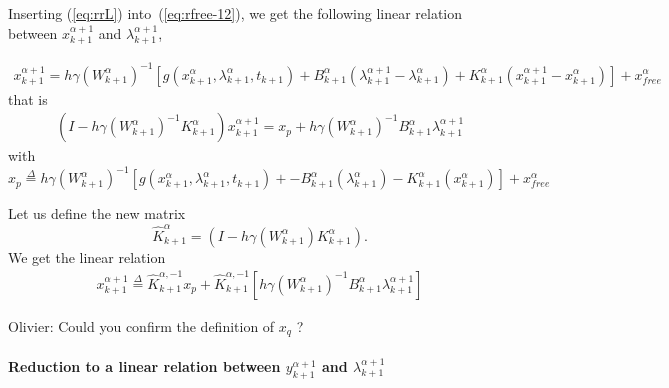 Inserting (\ref{eq:rrL}) into~(\ref{eq:rfree-12}), we get the following linear relation between $x^{\alpha+1}_{k+1}$ and
$\lambda^{\alpha+1}_{k+1}$, 

\begin{equation}
   \begin{array}{l}
     x^{\alpha+1}_{k+1} = h\gamma(W^{\alpha}_{k+1} )^{-1}\left[g(x^{\alpha}_{k+1},\lambda^{\alpha}_{k+1},t_{k+1}) +
    B^{\alpha}_{k+1} (\lambda^{\alpha+1}_{k+1} - \lambda^{\alpha}_{k+1})+K^{\alpha}_{k+1}
    (x^{\alpha+1}_{k+1} - x^{\alpha}_{k+1}) \right ] +x^\alpha_{free}
\end{array}
\end{equation}
that is 
\begin{equation}
  \begin{array}{l}
    (I-h \gamma (W^{\alpha}_{k+1})^{-1}K^{\alpha}_{k+1})x^{\alpha+1}_{k+1}=x_p + h \gamma (W^{\alpha}_{k+1})^{-1}    B^{\alpha}_{k+1} \lambda^{\alpha+1}_{k+1}
   \end{array}
\end{equation}
with 
\begin{equation}
  \boxed{x_p \stackrel{\Delta}{=}  h\gamma(W^{\alpha}_{k+1} )^{-1}\left[g(x^{\alpha}_{k+1},\lambda^{\alpha}_{k+1},t_{k+1}) +
    -B^{\alpha}_{k+1} (\lambda^{\alpha}_{k+1})-K^{\alpha}_{k+1} (x^{\alpha}_{k+1}) \right ] +x^\alpha_{free}}
\end{equation}



Let us  define the new matrix
\begin{equation}
\hat K^{\alpha}_{k+1}=(I-h \gamma (W^{\alpha}_{k+1})K^{\alpha}_{k+1}).
\label{eq:hatW}
\end{equation}
We get the linear relation
\begin{equation}
  \label{eq:rfree-13}
  \begin{array}{l}
 \boxed{   x^{\alpha+1}_{k+1}\stackrel{\Delta}{=} \hat K^{\alpha,-1}_{k+1} x_p + \hat K^{\alpha,-1}_{k+1} \left[ h \gamma (W^{\alpha}_{k+1})^{-1}    B^{\alpha}_{k+1} \lambda^{\alpha+1}_{k+1}\right]}
   \end{array}
\end{equation}


\begin{ndrva}
  Olivier: Could you confirm the definition of $x_q$ ?
\end{ndrva}



\paragraph{Reduction to a linear relation between  $y^{\alpha+1}_{k+1}$ and
$\lambda^{\alpha+1}_{k+1}$}

